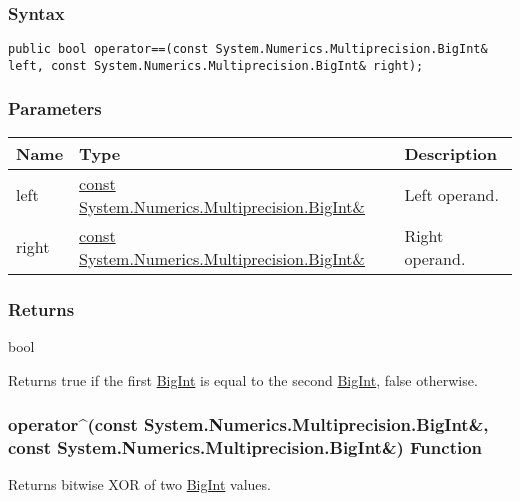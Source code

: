 \documentclass[a4paper,oneside,11.000000pt]{book}
\begin{document}
\subsubsection*{Syntax}
\texttt{public bool operator==(const System.Numerics.Multiprecision.BigInt\& left, const System.Numerics.Multiprecision.BigInt\& right);}
\subsubsection*{Parameters}
\begin{flushleft}
\begin{supertabular}[l]{!{\raggedright}p{1.30721cm}!{\raggedright}p{8.55945cm}!{\raggedright}p{3.66839cm}}
\textbf{Name}
& \textbf{Type}
& \textbf{Description}
\\
\hline
left
& \hyperlink{System.Numerics.Multiprecision.BigInt}{const System.\-Numerics.\-Multiprecision.\-BigInt\&\-}
& Left operand.

\\
right
& \hyperlink{System.Numerics.Multiprecision.BigInt}{const System.\-Numerics.\-Multiprecision.\-BigInt\&\-}
& Right operand.

\\
\end{supertabular}

\end{flushleft}
\subsubsection*{Returns}bool
\begin{flushleft}
Returns true if the first \hyperlink{System.Numerics.Multiprecision.BigInt}{BigInt} is equal to the second \hyperlink{System.Numerics.Multiprecision.BigInt}{BigInt}, false otherwise.

\end{flushleft}
\clearpage

\hypertarget{System.Numerics.Multiprecision.operator.xor.C.R.System.Numerics.Multiprecision.BigInt.C.R.System.Numerics.Multiprecision.BigInt}{\subsubsection*{operator\^{}(const System.Numerics.Multiprecision.BigInt\&, const System.Numerics.Multiprecision.BigInt\&) Function}}
\begin{flushleft}
Returns bitwise XOR of two \hyperlink{System.Numerics.Multiprecision.BigInt}{BigInt} values.

\end{flushleft}
\end{document}
